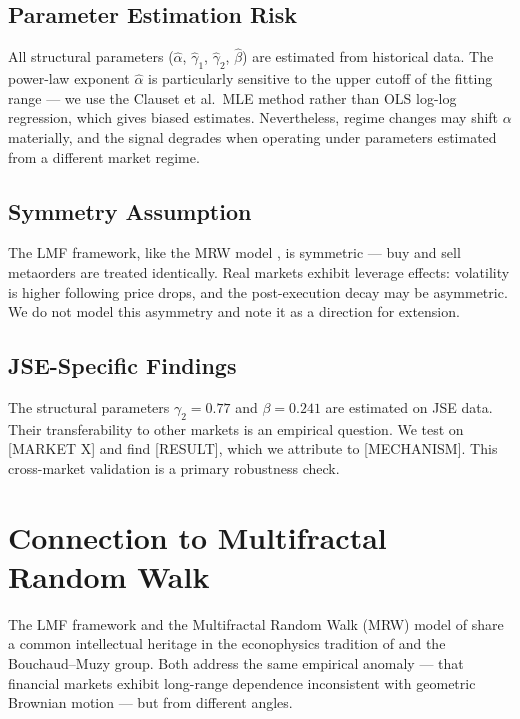 \documentclass[12pt,a4paper]{article}
\begin{document}
\subsection{Parameter Estimation Risk}

All structural parameters ($\hat{\alpha}$, $\hat{\gamma}_1$, $\hat{\gamma}_2$,
$\hat{\beta}$) are estimated from historical data. The power-law exponent
$\hat{\alpha}$ is particularly sensitive to the upper cutoff of the fitting
range --- we use the Clauset et al.\ MLE method \citep{clauset2009} rather
than OLS log-log regression, which gives biased estimates. Nevertheless,
regime changes may shift $\alpha$ materially, and the signal degrades when
operating under parameters estimated from a different market regime.

\subsection{Symmetry Assumption}

The LMF framework, like the MRW model \citep{bacry2001}, is symmetric ---
buy and sell metaorders are treated identically. Real markets exhibit leverage
effects: volatility is higher following price drops, and the post-execution
decay may be asymmetric. We do not model this asymmetry and note it as a
direction for extension.

\subsection{JSE-Specific Findings}

The structural parameters $\gamma_2 = 0.77$ and $\beta = 0.241$ are estimated
on JSE data. Their transferability to other markets is an empirical question.
We test on [MARKET X] and find [RESULT], which we attribute to [MECHANISM].
This cross-market validation is a primary robustness check.

\section{Connection to Multifractal Random Walk}
\label{sec:mrw}

The LMF framework and the Multifractal Random Walk (MRW) model of
\citet{bacry2001} share a common intellectual heritage in the econophysics
tradition of \citet{mandelbrot1997} and the Bouchaud--Muzy group. Both address
the same empirical anomaly --- that financial markets exhibit long-range
dependence inconsistent with geometric Brownian motion --- but from different
angles.
\end{document}

